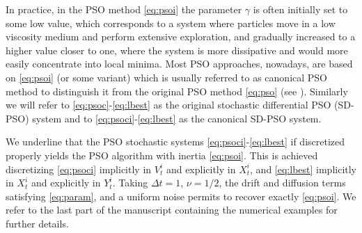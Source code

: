 \documentclass{ims9x6}
\begin{document}
In practice, in the PSO method \eqref{eq:psoi} the parameter $\gamma$ is often initially set to some low value, which corresponds to a system where particles move in a low viscosity medium and perform extensive exploration, and gradually increased to a higher value closer to one, where the system is more dissipative and would more easily concentrate into local minima.
Most PSO approaches, nowadays, are based on \eqref{eq:psoi} (or some variant) which is usually referred to as canonical PSO method to distinguish it from the original PSO method \eqref{eq:pso} (see \cite{poli2007particle}). Similarly we will refer to \eqref{eq:psoc}-\eqref{eq:lbest} as the original stochastic differential PSO (SD-PSO) system and to \eqref{eq:psoci}-\eqref{eq:lbest} as the canonical SD-PSO system.  
\begin{remark}
We underline that the PSO stochastic systems \eqref{eq:psoci}-\eqref{eq:lbest} if discretized properly yields the  PSO algorithm with inertia \eqref{eq:psoi}. This is achieved discretizing \eqref{eq:psoci} implicitly in $V^i_t$ and explicitly in $X^i_t$, and \eqref{eq:lbest} implicitly in $X^i_t$ and explicitly in $Y^i_t$. Taking $\Delta t=1$, $\nu=1/2$, the drift and diffusion terms satisfying \eqref{eq:param}, and a uniform noise permits to recover exactly \eqref{eq:psoi}. We refer to the last part of the manuscript containing the numerical examples for further details.
\end{remark}

\end{document}
